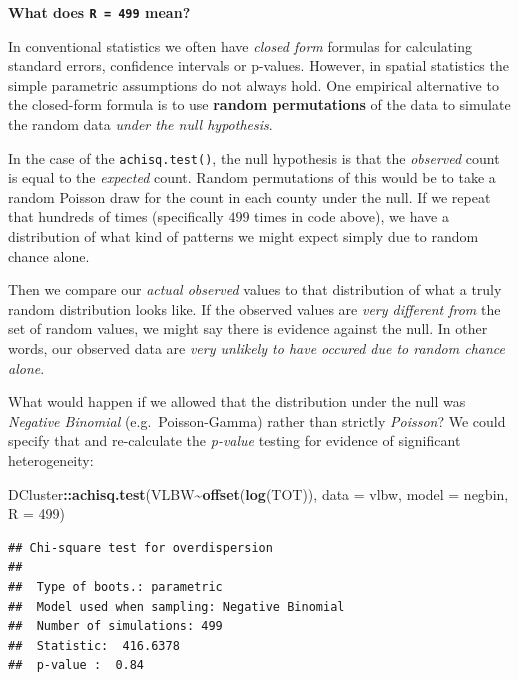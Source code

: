 \documentclass[
]{book}
\newenvironment{Shaded}{\begin{snugshade}}{\end{snugshade}}
\newcommand{\AttributeTok}[1]{\textcolor[rgb]{0.13,0.29,0.53}{#1}}
\newcommand{\DecValTok}[1]{\textcolor[rgb]{0.00,0.00,0.81}{#1}}
\newcommand{\FunctionTok}[1]{\textcolor[rgb]{0.13,0.29,0.53}{\textbf{#1}}}
\newcommand{\NormalTok}[1]{#1}
\newcommand{\SpecialCharTok}[1]{\textcolor[rgb]{0.81,0.36,0.00}{\textbf{#1}}}
\newcommand{\StringTok}[1]{\textcolor[rgb]{0.31,0.60,0.02}{#1}}
\newenvironment{rmdnote}[1]
  {
  \begin{itemize}
  \renewcommand{\labelitemi}{
    \raisebox{-.7\height}[0pt][0pt]{
      {\setkeys{Gin}{width=3em,keepaspectratio}\texttt{[image: images/\#1]}}
    }
  }
  \setlength{\fboxsep}{1em}
  \begin{note}
  \item
  }
  {
  \end{note}
  \end{itemize}
  }
\begin{document}
\begin{rmdnote}{note}
\textbf{What does \texttt{R\ =\ 499} mean?}

In conventional statistics we often have \emph{closed form} formulas for calculating standard errors, confidence intervals or p-values. However, in spatial statistics the simple parametric assumptions do not always hold. One empirical alternative to the closed-form formula is to use \textbf{random permutations} of the data to simulate the random data \emph{under the null hypothesis}.

In the case of the \texttt{achisq.test()}, the null hypothesis is that the \emph{observed} count is equal to the \emph{expected} count. Random permutations of this would be to take a random Poisson draw for the count in each county under the null. If we repeat that hundreds of times (specifically \(499\) times in code above), we have a distribution of what kind of patterns we might expect simply due to random chance alone.

Then we compare our \emph{actual observed} values to that distribution of what a truly random distribution looks like. If the observed values are \emph{very different from} the set of random values, we might say there is evidence against the null. In other words, our observed data are \emph{very unlikely to have occured due to random chance alone}.

\end{rmdnote}

What would happen if we allowed that the distribution under the null was \emph{Negative Binomial} (e.g.~Poisson-Gamma) rather than strictly \emph{Poisson}? We could specify that and re-calculate the \emph{p-value} testing for evidence of significant heterogeneity:

\begin{Shaded}
\begin{Highlighting}[]
\NormalTok{DCluster}\SpecialCharTok{::}\FunctionTok{achisq.test}\NormalTok{(VLBW}\SpecialCharTok{\textasciitilde{}}\FunctionTok{offset}\NormalTok{(}\FunctionTok{log}\NormalTok{(TOT)), }
                      \AttributeTok{data =}\NormalTok{ vlbw, }
                      \AttributeTok{model =} \StringTok{\textquotesingle{}negbin\textquotesingle{}}\NormalTok{,}
                      \AttributeTok{R =} \DecValTok{499}\NormalTok{)}
\end{Highlighting}
\end{Shaded}

\begin{verbatim}
## Chi-square test for overdispersion 
## 
##  Type of boots.: parametric 
##  Model used when sampling: Negative Binomial 
##  Number of simulations: 499 
##  Statistic:  416.6378 
##  p-value :  0.84
\end{verbatim}
\end{document}
